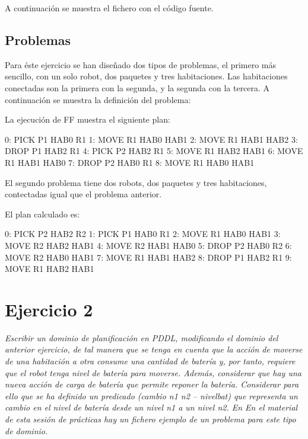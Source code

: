 \documentclass[	DIV=calc,%
							paper=a4,%
							fontsize=11pt]{scrartcl}	 					%
\newcommand{\lispscript}[2]{
    \myLisp[label=#2]{#1}
}
\begin{document}
A continuación se muestra el fichero con el código fuente.

\lispscript{../d1.pddl}{Dominio1.pddl}

\subsection{Problemas}

Para éste ejercicio se han diseñado dos tipos de problemas, el primero más sencillo, con un solo robot, dos paquetes y tres habitaciones. Las habitaciones conectadas son la primera con la segunda, y la segunda con la tercera. A continuación se muestra la definición del problema:

\lispscript{../p0e1.pddl}{p0e1.pddl}

La ejecución de FF muestra el siguiente plan:

\begin{bashcode}
	        0: PICK P1 HAB0 R1
	        1: MOVE R1 HAB0 HAB1
	        2: MOVE R1 HAB1 HAB2
	        3: DROP P1 HAB2 R1
	        4: PICK P2 HAB2 R1
	        5: MOVE R1 HAB2 HAB1
	        6: MOVE R1 HAB1 HAB0
	        7: DROP P2 HAB0 R1
	        8: MOVE R1 HAB0 HAB1
\end{bashcode}

El segundo problema tiene dos robots, dos paquetes y tres habitaciones, contectadas igual que el problema anterior.

\lispscript{../p1e1.pddl}{p1e1.pddl}

El plan calculado es:

\begin{bashcode}
	        0: PICK P2 HAB2 R2
	        1: PICK P1 HAB0 R1
	        2: MOVE R1 HAB0 HAB1
	        3: MOVE R2 HAB2 HAB1
	        4: MOVE R2 HAB1 HAB0
	        5: DROP P2 HAB0 R2
	        6: MOVE R2 HAB0 HAB1
	        7: MOVE R1 HAB1 HAB2
	        8: DROP P1 HAB2 R1
	        9: MOVE R1 HAB2 HAB1
\end{bashcode}

\section{Ejercicio 2}

\textit{Escribir un dominio de planificación en PDDL, modificando el dominio del anterior
ejercicio, de tal manera que se tenga en cuenta que la acción de moverse de una
habitación a otra consume una cantidad de batería y, por tanto, requiere que el robot
tenga nivel de batería para moverse. Además, considerar que hay una nueva acción de
carga de batería que permite reponer la batería. Considerar para ello que se ha
definido un predicado (cambio n1 n2 – nivelbat) que representa un cambio en el nivel
de batería desde un nivel n1 a un nivel n2. En En el material de esta sesión de prácticas
hay un fichero ejemplo de un problema para este tipo de dominio.}
\end{document}
